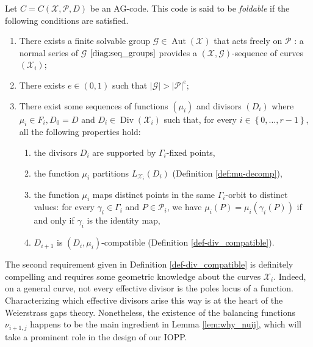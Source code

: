 \documentclass[a4paper,USenglish,autoref]{lipics-v2021}
\DeclareMathOperator{\Aut}{Aut}
\DeclareMathOperator{\Div}{Div}
\renewcommand{\vec}[1]{\boldsymbol{#1}}
\newcommand{\set}[1]{\left\{#1\right\}}
\newcommand{\size}[1]{\left|#1\right|}
\newcommand{\range}[1]{\set{0,\dots,#1-1}}
\newcommand\calX{\mathcal{X}}
\newcommand\calP{\mathcal{P}}
\newcommand\calG{\mathcal{G}}
\newcommand\XGseq{(\calX, \vec{\calG})}
\begin{document}
\begin{definition}\label{def:good_properties}
    Let $C =C(\calX,\calP,D)$ be an AG-code. This code is said to be \emph{foldable} if the following conditions are satisfied.
    \begin{enumerate}
        \item\label{it:gpe} There exists a finite solvable group $\calG \in \Aut(\calX)$ that acts freely on $\calP$ : a normal series of $\calG$ $\eqref{diag:seq_groups}$ provides a $\XGseq$-sequence of curves $(\calX_i)$;
        \item\label{it:card} There exists $e \in (0,1)$ such that $\size{\calG} > \size{\calP}^e$;
        \item\label{it:cdt} There exist some sequences of functions $(\mu_i)$ and divisors $(D_i)$ where $\mu_i \in F_i, D_0=D$ and  $D_i \in \Div(\calX_i)$ such that, for every $i \in \range{r}$, all the following properties hold:
        \begin{enumerate}
            \item the divisors $D_i$ are supported by $\Gamma_i$-fixed points,
            \item the function $\mu_i$ partitions $L_{\calX_i}(D_i)$ (Definition \ref{def:mu-decomp}),
            \item\label{sit:dif-values} the function $\mu_i$ maps distinct points in the same $\Gamma_i$-orbit to distinct values: for every $\gamma_i \in \Gamma_i$ and $P \in \calP_i$, we have $\mu_i(P)= \mu_i(\gamma_i(P))$ if and only if $\gamma_i$ is the identity map,
            \item  $D_{i+1}$ is $(D_i,\mu_i)$-compatible (Definition \ref{def-div_compatible}).			
        \end{enumerate}
        
    \end{enumerate}
\end{definition}



The second requirement given in Definition \ref{def-div_compatible} is definitely compelling and requires some geometric knowledge about the curves $\calX_i$. Indeed, on a general curve, not every effective divisor is the poles locus of a function. Characterizing which effective divisors arise this way is at the heart of the Weierstrass gaps theory. Nonetheless, the existence of the balancing functions $\nu_{i+1,j}$ happens to be the main ingredient in Lemma \ref{lem:why_nuij}, which will take a prominent role in the design of our IOPP.
\end{document}
